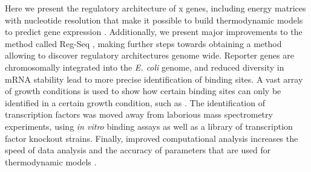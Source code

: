 Here we present the regulatory architecture of x  genes, including energy matrices with nucleotide resolution that make it possible to build thermodynamic models to predict gene expression \cite{kinney2010using,belliveau2018systematic,barnes2019mapping,ireland2020deciphering}. Additionally, we present major improvements to the method called Reg-Seq \cite{ireland2020deciphering}, making further steps towards obtaining a method allowing to discover regulatory architectures genome wide. Reporter genes are chromosomally integrated into the \textit{E. coli} genome, and reduced diversity in mRNA stability lead to more precise identification of binding sites. A vast array of growth conditions is used to show how certain binding sites can only be identified in a certain growth condition, such as . The identification of transcription factors was moved away from laborious mass spectrometry experiments, using \textit{in vitro} binding assays as well as a library of transcription factor knockout strains. Finally, improved computational analysis increases the speed of data analysis and the accuracy of parameters that are used for thermodynamic models .



